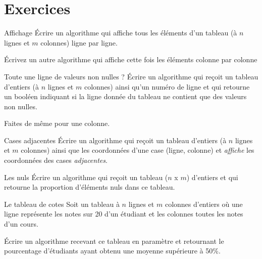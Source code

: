 \section{Exercices}

	\begin{Exercice}{Affichage}
		Écrire un algorithme qui affiche tous les éléments d'un
		tableau (à $n$ lignes et $m$ colonnes) ligne par ligne.
		
		Écrivez un autre algorithme qui affiche cette fois les éléments
		colonne par colonne
	\end{Exercice}

	\begin{Exercice}{Toute une ligne de valeurs non nulles ?}
		Écrire un algorithme qui reçoit un tableau d'entiers
		(à $n$ lignes et $m$ colonnes)
		ainsi qu'un numéro de ligne
		et qui retourne un booléen indiquant si la ligne donnée du tableau
		ne contient que des valeurs non nulles.
		
		\begin{LDA}
		\end{LDA}
		
		Faites de même pour une colonne.
	\end{Exercice}
	
	\begin{Exercice}{Cases adjacentes}
		Écrire un algorithme qui reçoit un tableau d'entiers
		(à $n$ lignes et $m$ colonnes)
		ainsi que les coordonnées d'une case (ligne, colonne)
		et \emph{affiche} les coordonnées
		des cases \emph{adjacentes}.		
	\end{Exercice}
	
	\begin{Exercice}{Les nuls}
		Écrire un algorithme qui reçoit un tableau ($n$ x $m$)
		d'entiers et qui retourne la proportion
		d'éléments nuls dans ce tableau.
	\end{Exercice}
	
	\begin{Exercice}{Le tableau de cotes}
		Soit un tableau à $n$ lignes et $m$ colonnes d'entiers où
		une ligne représente les notes sur 20 d'un étudiant et
		les colonnes toutes les notes d'un cours.
		
		Écrire un algorithme recevant ce tableau en paramètre et retournant le
		pourcentage d'étudiants ayant obtenu une moyenne
		supérieure à 50\%.
	\end{Exercice}
	
